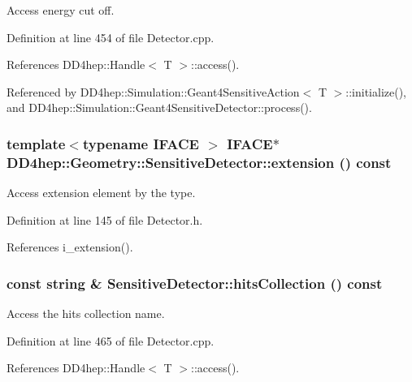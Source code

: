 Access energy cut off. 

Definition at line 454 of file Detector.cpp.

References DD4hep::Handle$<$ T $>$::access().

Referenced by DD4hep::Simulation::Geant4SensitiveAction$<$ T $>$::initialize(), and DD4hep::Simulation::Geant4SensitiveDetector::process().\hypertarget{class_d_d4hep_1_1_geometry_1_1_sensitive_detector_a454154c8be26b2919d4b53c5ed738a57}{
\subsubsection[{extension}]{\setlength{\rightskip}{0pt plus 5cm}template$<$typename IFACE $>$ IFACE$\ast$ DD4hep::Geometry::SensitiveDetector::extension () const}}
\label{class_d_d4hep_1_1_geometry_1_1_sensitive_detector_a454154c8be26b2919d4b53c5ed738a57}


Access extension element by the type. 

Definition at line 145 of file Detector.h.

References i\_\-extension().\hypertarget{class_d_d4hep_1_1_geometry_1_1_sensitive_detector_a11b8c25eaa4c3da343abee5e796b62f7}{
\subsubsection[{hitsCollection}]{\setlength{\rightskip}{0pt plus 5cm}const {\bf string} \& SensitiveDetector::hitsCollection () const}}
\label{class_d_d4hep_1_1_geometry_1_1_sensitive_detector_a11b8c25eaa4c3da343abee5e796b62f7}


Access the hits collection name. 

Definition at line 465 of file Detector.cpp.

References DD4hep::Handle$<$ T $>$::access().

